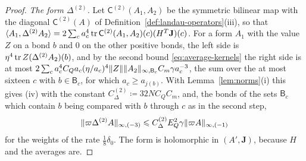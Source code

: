 \documentclass[11pt]{preprint}
\DeclarePairedDelimiter{\norm}{\lVert}{\rVert}
\numberwithin{equation}{section}
\begin{document}
\begin{proof}
\emph{The form $\Delta^{(2)}$.} Let $\mathsf C^{(2)}(A_1, A_2)$ be the symmetric bilinear map with the diagonal $\mathsf C^{(2)}(A)$ of Definition~\ref{def:landau-operators}(iii), so that $\langle A_1, \Delta^{(2)}A_2\rangle = 2\sum_ca_c^4\operatorname{tr}\mathsf C^{(2)}(A_1, A_2)(c)(H^T\mathbf J)(c)$. For a form $A_1$ with the value $Z$ on a bond $b$ and $0$ on the other positive bonds, the left side is $\eta^4\operatorname{tr} Z(\Delta^{(2)}A_2)(b)$, and by the second bound \eqref{eq:average-kernels} the right side is at most $2\sum_ca_c^4C_Qa_c(\eta/a_c)^4\norm Z\norm{A_2}_{\infty,\mathsf B_c}C_m\gamma a_c^{-3}$, the sum over the at most sixteen $c$ with $b \in \mathsf B_c$, for which $a_c \geqslant a_{j(b)}$. With Lemma~\ref{lem:norms}(i) this gives (iv) with the constant $C_\Delta^{(2)} \coloneqq 32NC_QC_m$, and, the bonds of the sets $\mathsf B_c$ which contain $b$ being compared with $b$ through $c$ as in the second step,
\[
    \norm{\varpi\Delta^{(2)}A}_{\infty,(-3)} \leqslant C_\Delta^{(2)}E_Q^2\gamma\norm{\varpi A}_{\infty,(-1)}
\]
for the weights of the rate $\frac{1}{8}\delta_0$. The form is holomorphic in $(A', \mathbf J)$, because $H$ and the averages are.


\end{proof}
\end{document}
